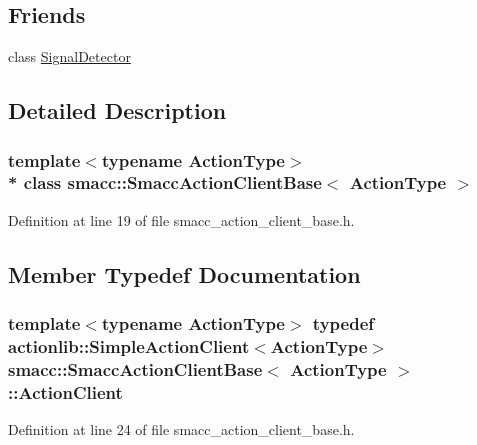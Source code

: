 \subsection*{Friends}
\begin{DoxyCompactItemize}
\item 
class \hyperlink{classsmacc_1_1SmaccActionClientBase_a9fb9044f83e768849d1b42d9d0d5508e}{Signal\+Detector}
\end{DoxyCompactItemize}


\subsection{Detailed Description}
\subsubsection*{template$<$typename Action\+Type$>$\\*
class smacc\+::\+Smacc\+Action\+Client\+Base$<$ Action\+Type $>$}



Definition at line 19 of file smacc\+\_\+action\+\_\+client\+\_\+base.\+h.



\subsection{Member Typedef Documentation}
\subsubsection[{\texorpdfstring{Action\+Client}{ActionClient}}]{\setlength{\rightskip}{0pt plus 5cm}template$<$typename Action\+Type$>$ typedef actionlib\+::\+Simple\+Action\+Client$<$Action\+Type$>$ {\bf smacc\+::\+Smacc\+Action\+Client\+Base}$<$ Action\+Type $>$\+::{\bf Action\+Client}}\hypertarget{classsmacc_1_1SmaccActionClientBase_aea1392d9e41f48bda1de8acaec1c3233}{}\label{classsmacc_1_1SmaccActionClientBase_aea1392d9e41f48bda1de8acaec1c3233}


Definition at line 24 of file smacc\+\_\+action\+\_\+client\+\_\+base.\+h.

